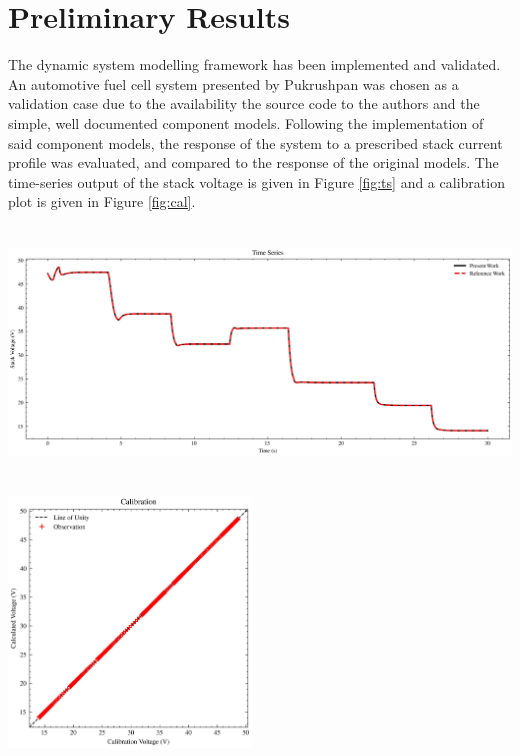 \section{Preliminary Results}
The dynamic system modelling framework has been implemented and validated.
An automotive fuel cell system presented by Pukrushpan \etal \cite{pukrushpanControlFuelCell2004a} was chosen as a validation case due to the availability the source code to the authors and the simple, well documented component models. Following the implementation of said component models, the response of the system to a prescribed stack current profile was evaluated, and compared to the response of the original models. The time-series output of the stack voltage is given in Figure \ref{fig:ts} and a calibration plot is given in Figure \ref{fig:cal}.
\medskip
\noindent
\begin{minipage}[t]{\linewidth}
	\begin{center}
		\includegraphics[height=18em]{figures/voltage_ts.jpg}
		\label{fig:ts}
	\end{center}
\end{minipage}%
\hfill\vspace{1em}
\begin{minipage}[t]{\linewidth}
	\begin{center}
		\includegraphics[height=18em]{figures/voltage_cal.jpg}
		\label{fig:cal}
	\end{center}
\end{minipage}
